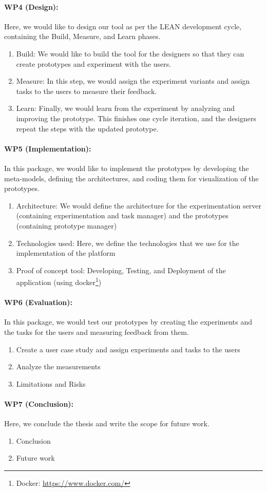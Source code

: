 \paragraph{WP4 (Design):} Here, we would like to design our tool as per the LEAN development cycle, containing the Build, Measure, and Learn phases.
\begin{enumerate}
    \item Build: We would like to build the tool for the designers so that they can create prototypes and experiment with the users.
    \item Measure: In this step, we would assign the experiment variants and assign tasks to the users to measure their feedback.
    \item Learn: Finally, we would learn from the experiment by analyzing and improving the prototype. This finishes one cycle iteration, and the designers repeat the steps with the updated prototype.
\end{enumerate}

\paragraph{WP5 (Implementation):} In this package, we would like to implement the prototypes by developing the meta-models, defining the architectures, and coding them for visualization of the prototypes.
\begin{enumerate}
    \item Architecture: We would define the architecture for the experimentation server (containing experimentation and task manager) and the prototypes (containing prototype manager)
    \item Technologies used: Here, we define the technologies that we use for the implementation of the platform 
    \item Proof of concept tool: Developing, Testing, and Deployment of the application (using docker\footnote{Docker: \url{https://www.docker.com/}})
\end{enumerate}

\paragraph{WP6 (Evaluation):} In this package, we would test our prototypes by creating the experiments and the tasks for the users and measuring feedback from them.
\begin{enumerate}
    \item Create a user case study and assign experiments and tasks to the users 
    \item Analyze the measurements
    \item Limitations and Risks
\end{enumerate}

\paragraph{WP7 (Conclusion):} Here, we conclude the thesis and write the scope for future work.
\begin{enumerate}
    \item Conclusion
    \item Future work
\end{enumerate}

